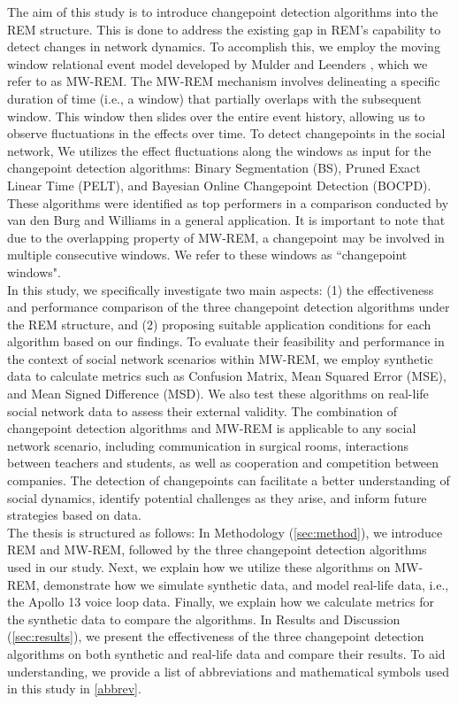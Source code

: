 \documentclass[]{interact}
\theoremstyle{plain}%
\theoremstyle{definition}
\theoremstyle{remark}
\begin{document}
	The aim of this study is to introduce changepoint detection algorithms into the REM structure. This is done to address the existing gap in REM's capability to detect changes in network dynamics. To accomplish this, we employ the moving window relational event model developed by Mulder and Leenders \cite{mulderModelingEvolutionInteraction2019}, which we refer to as MW-REM. The MW-REM mechanism involves delineating a specific duration of time (i.e., a window) that partially overlaps with the subsequent window. This window then slides over the entire event history, allowing us to observe fluctuations in the effects over time. To detect changepoints in the social network, We utilizes the effect fluctuations along the windows as input for the changepoint detection algorithms: Binary Segmentation (BS), Pruned Exact Linear Time (PELT), and Bayesian Online Changepoint Detection (BOCPD). These algorithms were identified as top performers in a comparison conducted by van den Burg and Williams \cite{burgEvaluationChangePoint2022} in a general application. It is important to note that due to the overlapping property of MW-REM, a changepoint may be involved in multiple consecutive windows. We refer to these windows as ``changepoint windows". \\
	
	In this study, we specifically investigate two main aspects: (1) the effectiveness and performance comparison of the three changepoint detection algorithms under the REM structure, and (2) proposing suitable application conditions for each algorithm based on our findings. To evaluate their feasibility and performance in the context of social network scenarios within MW-REM, we employ synthetic data to calculate metrics such as Confusion Matrix, Mean Squared Error (MSE), and Mean Signed Difference (MSD). We also test these algorithms on real-life social network data to assess their external validity. The combination of changepoint detection algorithms and MW-REM is applicable to any social network scenario, including communication in surgical rooms, interactions between teachers and students, as well as cooperation and competition between companies. The detection of changepoints can facilitate a better understanding of social dynamics, identify potential challenges as they arise, and inform future strategies based on data. \\ %
    
    The thesis is structured as follows: In Methodology (\autoref{sec:method}), we introduce REM and MW-REM, followed by the three changepoint detection algorithms used in our study. Next, we explain how we utilize these algorithms on MW-REM, demonstrate how we simulate synthetic data, and model real-life data, i.e., the Apollo 13 voice loop data. Finally, we explain how we calculate metrics for the synthetic data to compare the algorithms. In Results and Discussion (\autoref{sec:results}), we present the effectiveness of the three changepoint detection algorithms on both synthetic and real-life data and compare their results. To aid understanding, we provide a list of abbreviations and mathematical symbols used in this study in \autoref{abbrev}.
    
\end{document}
